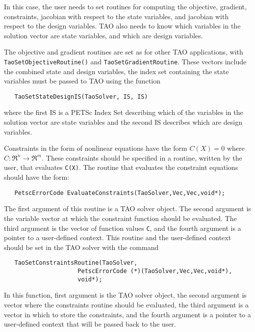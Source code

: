 In this case, the user needs to set routines for computing the objective,
gradient, constraints, jacobian with respect to the state variables, 
and jacobian with
respect to the design variables.  TAO also needs to know which variables
in the solution vector are state variables, and which are design variables.

The objective and gradient routines are set as for other TAO applications,
with {\tt Tao\-Set\-Object\-ive\-Routine()} and {\tt Tao\-Set\-Gradient\-Routine}.
These vectors include the combined state and design variables, the index set
containing the state variables must be passed to TAO using the function
\begin{verbatim}
   TaoSetStateDesignIS(TaoSolver, IS, IS)
\end{verbatim}
where the first IS is a PETSc Index Set describing which of the variables in the 
solution vector are state variables and the second IS describes which are
design variables.

Constraints in the form of nonlinear equations have the form
$C(X) = 0$ where $C: \Re^n \to \Re^m$.
These constraints should be specified in a 
routine, written by the user, that evaluates {\tt C(X)}.
The routine that evaluates the constraint equations should have the form:
\begin{verbatim}
   PetscErrorCode EvaluateConstraints(TaoSolver,Vec,Vec,void*);
\end{verbatim}
\noindent
The first argument of this routine is a TAO solver object.  The second argument
is the variable vector at which the constraint function should be evaluated.  
The third argument is the vector of function values {\tt C}, and the fourth
argument is a pointer to a user-defined context.
This routine  and the user-defined context 
should be set in the TAO solver with the command
\begin{verbatim}
   TaoSetConstraintsRoutine(TaoSolver,
                     PetscErrorCode (*)(TaoSolver,Vec,Vec,void*),
                     void*);
\end{verbatim}
\noindent
In this function, first argument is the TAO solver object,
the second argument is vector where the constraints routine should be
evaluated, the third argument is a vector in which to store the constraints,
and the fourth argument is a pointer to a user-defined context that will
be passed back to the user.

